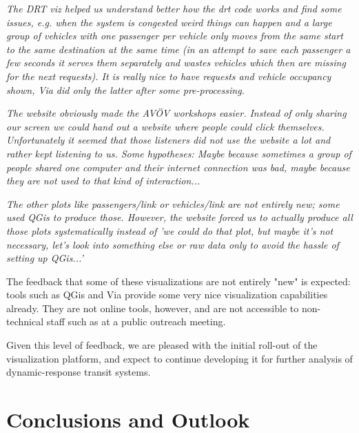 \small{

\begin{displayquote}\emph{
  The DRT viz helped us understand better how the drt code works and find some issues, e.g. when the system is congested weird things can happen and a large group of vehicles with one passenger per vehicle only moves from the same start to the same destination at the same time (in an attempt to save each passenger a few seconds it serves them separately and wastes vehicles which then are missing for the next requests). It is really nice to have requests and vehicle occupancy shown, Via did only the latter after some pre-processing.
}\end{displayquote}

\begin{displayquote}\emph{
  The website obviously made the AVÖV workshops easier. Instead of only sharing our screen we could hand out a website where people could click themselves. Unfortunately it seemed that those listeners did not use the website a lot and rather kept listening to us. Some hypotheses: Maybe because sometimes a group of people shared one computer and their internet connection was bad, maybe because they are not used to that kind of interaction...
}\end{displayquote}

\begin{displayquote}\emph{
  The other plots like passengers/link or vehicles/link are not entirely new; some used QGis to produce those. However, the website forced us to actually produce all those plots systematically instead of 'we could do that plot, but maybe it's not necessary, let's look into something else or raw data only to avoid the hassle of setting up QGis...'
}\end{displayquote}

}

The feedback that some of these visualizations are not entirely "new" is expected: tools such as QGis and Via provide some very nice visualization capabilities already. They are not online tools, however, and are not accessible to non-technical staff such as at a public outreach meeting.

Given this level of feedback, we are pleased with the initial roll-out of the visualization platform, and expect to continue developing it for further analysis of dynamic-response transit systems.

\section{Conclusions and Outlook}
\label{conclusions}

